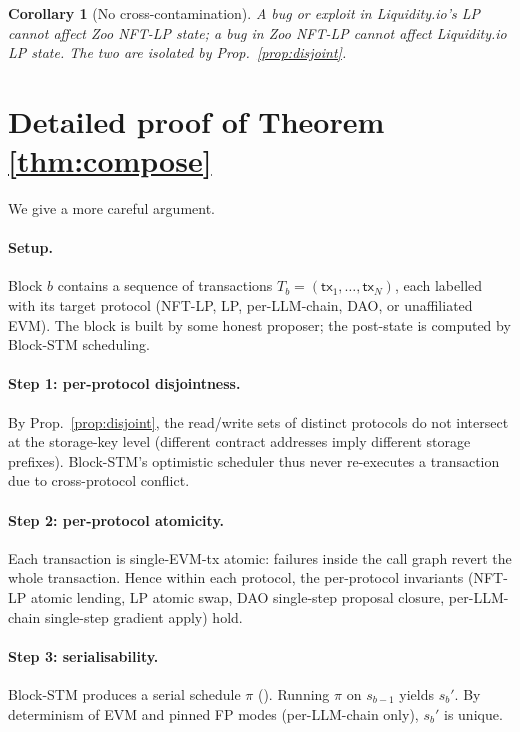 \documentclass[11pt]{article}
\newtheorem{corollary}[theorem]{Corollary}
\begin{document}
\begin{corollary}[No cross-contamination]
\label{cor:no-cross}
A bug or exploit in Liquidity.io's LP cannot affect Zoo NFT-LP
state; a bug in Zoo NFT-LP cannot affect Liquidity.io LP state.
The two are isolated by Prop.~\ref{prop:disjoint}.
\end{corollary}

\section{Detailed proof of Theorem \ref{thm:compose}}
\label{sec:proof-detail}

We give a more careful argument.

\paragraph{Setup.}
Block $b$ contains a sequence of transactions
$T_b = (\mathsf{tx}_1, \ldots, \mathsf{tx}_N)$, each labelled with
its target protocol (NFT-LP, LP, per-LLM-chain, DAO, or
unaffiliated EVM). The block is built by some honest proposer; the
post-state is computed by Block-STM scheduling.

\paragraph{Step 1: per-protocol disjointness.}
By Prop.~\ref{prop:disjoint}, the read/write sets of distinct
protocols do not intersect at the storage-key level (different
contract addresses imply different storage prefixes). Block-STM's
optimistic scheduler thus never re-executes a transaction due to
cross-protocol conflict.

\paragraph{Step 2: per-protocol atomicity.}
Each transaction is single-EVM-tx atomic: failures inside the call
graph revert the whole transaction. Hence within each protocol,
the per-protocol invariants (NFT-LP atomic lending,
LP atomic swap, DAO single-step proposal closure, per-LLM-chain
single-step gradient apply) hold.

\paragraph{Step 3: serialisability.}
Block-STM produces a serial schedule $\pi$ (\cite{dagevm-lean}).
Running $\pi$ on $s_{b-1}$ yields $s_b'$. By determinism of EVM
and pinned FP modes (per-LLM-chain only), $s_b'$ is unique.
\end{document}
